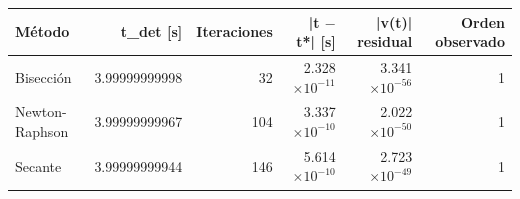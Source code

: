 {\footnotesize
\begin{longtable}{lrrrrr}
\toprule
\textbf{Método} & \textbf{t\_det [s]} & \textbf{Iteraciones} & \textbf{|t $-$ t*| [s]} & \textbf{|v(t)| residual} & \textbf{Orden observado} \\
\midrule
\endhead
Bisección & 3.99999999998 & 32 & 2.328$\times10^{-11}$ & 3.341$\times10^{-56}$ & 1 \\
Newton-Raphson & 3.99999999967 & 104 & 3.337$\times10^{-10}$ & 2.022$\times10^{-50}$ & 1 \\
Secante & 3.99999999944 & 146 & 5.614$\times10^{-10}$ & 2.723$\times10^{-49}$ & 1 \\
\bottomrule
\end{longtable}
}
